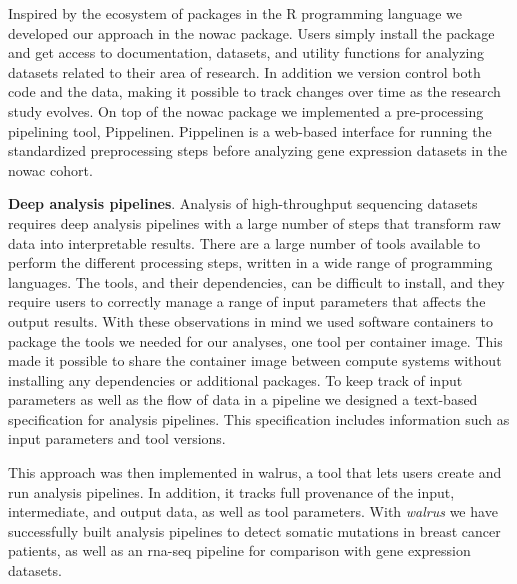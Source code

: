 Inspired by the ecosystem of packages in the R programming
language we developed our approach in the \gls{nowac} package. Users simply
install the package and get access to documentation, datasets, and utility
functions for analyzing datasets related to their area of research. 
In addition we version control both code and the data, making it possible to
track changes over time as the research study evolves. On top of the \gls{nowac}
package we implemented a pre-processing pipelining tool, Pippelinen. Pippelinen
is a web-based interface for running the standardized preprocessing steps before
analyzing gene expression datasets in the \gls{nowac} cohort. 

\textbf{Deep analysis pipelines}. 
Analysis of high-throughput sequencing datasets requires deep analysis pipelines
with a large number of steps that transform raw data into interpretable
results\cite{diao2015building}. There are a large number of tools available to
perform the different processing steps, written in a wide range of programming
languages. The tools, and their dependencies, can be difficult to install, and
they require users to correctly manage a range of input parameters that affects
the output results. With these observations in mind we used software containers
to package the tools we needed for our analyses, one tool per container image.
This made it possible to share the container image between compute systems
without installing any dependencies or additional packages. To keep track of
input parameters as well as the flow of data in a pipeline we designed a
text-based specification for analysis pipelines. This specification includes
information such as input parameters and tool versions. 

This approach was then implemented in walrus, a tool
that lets users create and run analysis pipelines. In addition, it tracks full
provenance of the input, intermediate, and output data, as well as tool
parameters. With \emph{walrus} we have successfully built analysis pipelines to
detect somatic mutations in breast cancer patients, as well as an \gls{rna}-seq
pipeline for comparison with gene expression datasets. 

